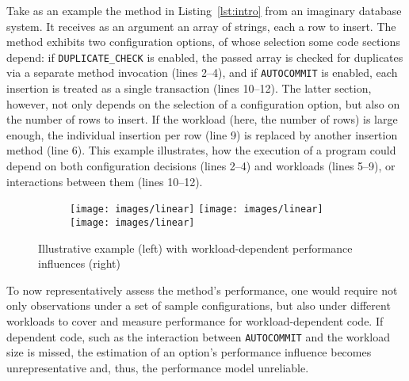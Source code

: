 Take as an example the method in Listing~\ref{lst:intro} from an imaginary database system. It receives as an argument an array of strings, each a row to insert. The method exhibits two configuration options, of whose selection some code sections depend: if \texttt{DUPLICATE\_CHECK} is enabled, the passed array is checked for duplicates via a separate method invocation (lines 2--4), and if \texttt{AUTOCOMMIT} is enabled, each insertion is treated as a single transaction (lines 10--12). The latter section, however, not only depends on the selection of a configuration option, but also on the number of rows to insert. If the workload (here, the number of rows) is large enough, the individual insertion per row (line 9) is replaced by another insertion method (line 6). This example illustrates, how the execution of a program could depend on both configuration decisions (lines 2--4) and workloads (lines 5--9), or interactions between them (lines 10--12).

\begin{figure}
\begin{subfigure}[l]{0.63\linewidth}
	


\end{subfigure}
	\begin{subfigure}[l]{0.35\linewidth}
		\texttt{[image: images/linear]}
		\texttt{[image: images/linear]}
		\texttt{[image: images/linear]}
	\end{subfigure}
	\caption{Illustrative example (left) with workload-dependent performance influences (right)}
	\label{fig:intro}
\end{figure}


To now representatively assess the method's performance, one would require not only observations under a set of sample configurations, but also under different workloads to cover and measure performance for workload-dependent code. If dependent code, such as the interaction between \texttt{AUTOCOMMIT} and the workload size is missed, the estimation of an option's performance influence becomes unrepresentative and, thus, the performance model unreliable.

